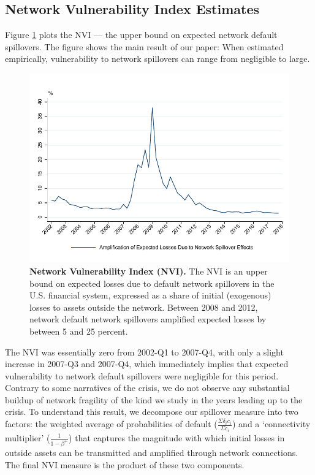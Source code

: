 \subsection{Network Vulnerability Index Estimates}

Figure \ref{fig:NVI_benchmark} plots the NVI --- the upper bound on expected network default spillovers. The figure shows the main result of our paper: When estimated empirically, vulnerability to network spillovers can range from negligible to large. 

\begin{figure}[h!]
\begin{center}
\includegraphics[width = \textwidth]{../output/NVI_benchmark.pdf}
\end{center}
\caption[]{\textbf{Network Vulnerability Index (NVI).} The NVI is an upper bound on expected losses due to default network spillovers in the U.S. financial system, expressed as a share of initial (exogenous) losses to assets outside the network. Between 2008 and 2012, network default network spillovers amplified expected losses by between 5 and 25 percent.} \label{fig:NVI_benchmark}
\end{figure}

The NVI was essentially zero from 2002-Q1 to 2007-Q4, with only a slight increase in 2007-Q3 and 2007-Q4, which immediately implies that expected vulnerability to network default spillovers were negligible for this period. Contrary to some narratives of the crisis, we do not observe any substantial buildup of network fragility of the kind we study in the years leading up to the crisis. To understand this result, we decompose our spillover measure into two factors: the weighted average of probabilities of default ($\frac{\Sigma \delta_i c_i}{\Sigma c_i}$) and a `connectivity multiplier' ($\frac{1}{1-\beta^+}$) that captures the magnitude with which initial losses in outside assets can be transmitted and amplified through network connections. The final NVI measure is the product of these two components. 


